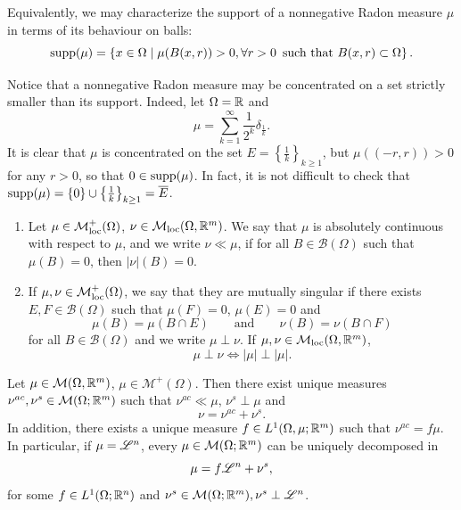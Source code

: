 \begin{exercise}
Equivalently, we may characterize the support of a nonnegative Radon measure $\mu$ in terms of its behaviour on balls:
\[
\operatorname{supp} (\mu) = \left \{x \in \Omega \mid \mu(B(x,r)) > 0, \forall r > 0 \, \text{ such that } B(x,r) \subset \Omega\right \}.
\]
\end{exercise}

\begin{remark}
Notice that a nonnegative Radon measure may be concentrated on a set strictly smaller than its support. Indeed, let $\Omega = \mathbb{R}$ and $$\mu = \sum_{k = 1}^{\infty} \frac{1}{2^{k}} \delta_{\frac{1}{k}}.$$
It is clear that $\mu$ is concentrated on the set $E = \left \{ \frac{1}{k}\right \}_{k \ge 1}$, but $\mu((-r, r)) > 0$ for any $r> 0$, so that $0 \in \operatorname{supp}(\mu)$. In fact, it is not difficult to check that $\operatorname{supp}(\mu) = \{0\} \cup \left \{ \frac{1}{k}\right \}_{k \ge 1} = \overline{E}$. 
\end{remark}

\begin{definition}\hfill
\begin{enumerate}[1.]
\item Let $\mu \in \mathcal{M}^{+}_{\rm loc}(\Omega)$, $\nu \in \mathcal{M}_{\rm loc}(\Omega,\mathbb{R}^m)$. We say
that $\mu$ is absolutely continuous with respect to $\mu$, and we write $\nu \ll \mu$, if
for all $B \in \mathcal{B}(\Omega)$ such that $\mu(B) = 0$, then $|\nu|(B) = 0$.
\item If $\mu,\nu \in \mathcal{M}^+_{\rm loc}(\Omega)$, we say that they are mutually
singular if there exists $E,F \in \mathcal{B}(\Omega)$ such that $\mu(F) =0$,
$\mu(E) = 0$ and 
\[
\mu(B) = \mu (B\cap E) \qquad \text{and} \qquad
\nu(B) = \nu(B \cap F)
\]
for all $B \in \mathcal{B}(\Omega)$ and we write $\mu \perp \nu$. If $\mu,\nu
\in \mathcal{M}_{\rm loc}(\Omega,\mathbb{R}^m)$, 
\[
\mu \perp \nu \iff |\mu| \perp |\mu|.
\]
\end{enumerate}
\end{definition}

\begin{theorem} \label{thm:Radon_Nikodym}
Let $\mu \in \mathcal{M}(\Omega,\mathbb{R}^m)$, $\mu \in \mathcal{M}^+(\Omega)$. Then
there exist unique measures $\nu^{ac},\nu^{s} \in \mathcal{M}(\Omega; \mathbb{R}^m)$ such
that $\nu^{ac} \ll \mu$, $\nu^s \perp \mu$ and 
\begin{equation} \label{eq:Leb_decomp}
\nu = \nu^{ac} + \nu^s. 
\end{equation}
In addition, there exists a unique measure $f\in L^1(\Omega,\mu;\mathbb{R}^m)$ such that
$\nu^{ac} = f\mu$.
\\
In particular, if $\mu = \mathscr{L}^{n}$, every $\mu \in \mathcal{M}(\Omega;\mathbb{R}^m)$ can be
uniquely decomposed in
\[
\mu = f \mathscr{L}^{n} + \nu^s, 
\]
for some $f\in L^1(\Omega; \mathbb{R}^n)$ and $\nu^s \in \mathcal{M}(\Omega;\mathbb{R}^m), \nu^s \perp \mathscr{L}^{n}$.
\end{theorem}

